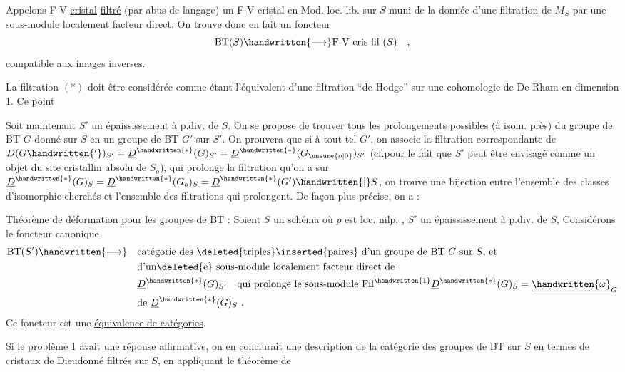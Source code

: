 Appelons F-V-\uline{cristal} \uline{filtré}  (par abus de langage) un F-V-cristal en Mod. loc. lib. sur $S$ muni de  la donnée d'une filtration de $M_S$ par une sous-module localement facteur direct. On trouve donc en fait un foncteur
\[
\mathrm{BT}(S)\handwritten{\longrightarrow}\text{F-V-cris fil }(S)\quad ,
\]
compatible aux images inverses.

 La filtration $(*)$ doit être considérée comme étant l'équivalent d'une filtration ``de Hodge'' sur une cohomologie de De Rham  en dimension 1.  Ce point 

Soit maintenant $S'$ un épaississement à p.div. de $S$. On se propose de trouver tous les prolongements possibles (à isom. près) du groupe de BT $G$ donné sur $S$ en un groupe de BT $G'$ sur $S'$. On  prouvera que si à tout tel $G'$, on associe la filtration correspondante de $D(G\handwritten{'})_{S'}=\underline{D}^{\handwritten{*}}(G)_{S'}=\underline{D}^{\handwritten{*}}(G_{\unsure{o|0}})_{S'}$ (cf.\qquad pour le fait que $S'$ peut être envisagé comme un objet du site cristallin absolu de $S_o$), qui prolonge la filtration qu'on a sur $\underline{D}^{\handwritten{*}}(G)_S=\underline{D}^{\handwritten{*}}(G_o)_S=\underline{D}^{\handwritten{*}}(G')\handwritten{|}S$, on trouve une bijection entre l'ensemble des classes d'isomorphie cherchés et l'ensemble des filtrations qui prolongent. De façon plus précise, on a :

\uline{Théorème de déformation pour les groupes de} BT : Soient $S$ un schéma où $p$ est loc. nilp. , $S'$ un épaississement à p.div. de $S$, Considérons le foncteur canonique
\[
\begin{aligned}
\mathrm{BT}(S')\handwritten{\longrightarrow}\quad&
\text{catégorie des \deleted{triples}\inserted{paires} d'un groupe de BT $G$ sur $S$, et}\\
&\text{d'un\deleted{e} sous-module localement facteur direct de}\\
&\underline{D}^{\handwritten{*}}(G)_{S'}\quad\text{qui prolonge le sous-module }\mathrm{Fil}^{\handwritten{1}}\underline{D}^{\handwritten{*}}(G)_S=\underline{\handwritten{\omega}}_G\\
&\text{de }\underline{D}^{\handwritten{*}}(G)_S\ .
\end{aligned}
\]
Ce foncteur est une \uline{équivalence de catégories}. 

 Si le  problème 1 avait une réponse affirmative, on en conclurait une description de la catégorie des groupes de BT sur $S$ en termes de cristaux de Dieudonné filtrés sur $S$, en appliquant le théorème de
